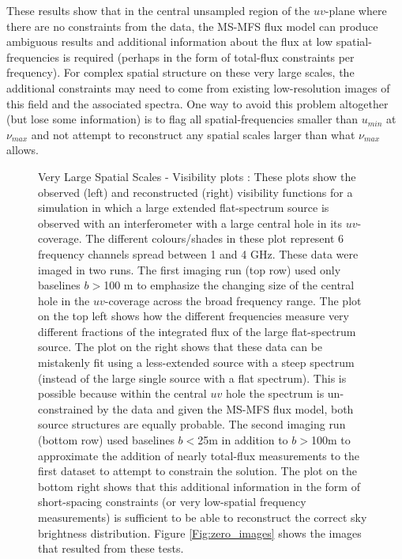 \documentclass[structabstract]{stylefiles/aa}
\begin{document}
\noindent These results show that in the central unsampled region
of the $uv$-plane where there are no constraints from the data,
the MS-MFS flux model can produce ambiguous results and additional
information about the flux at low spatial-frequencies is required
(perhaps in the form of total-flux constraints per frequency).
For complex spatial structure on these very large scales, the additional 
constraints may need to
come from existing low-resolution images of this field and the
associated spectra.
One way to avoid this problem altogether (but lose some information)
is to flag all spatial-frequencies smaller than $u_{min}$ at $\nu_{max}$
and not attempt to reconstruct any spatial scales larger than what
$\nu_{max}$ allows. 

\begin{figure}[h!]
\begin{center}
\end{center}
\caption[Very Large Spatial Scales : Visibility plots]%
{\small Very Large Spatial Scales - Visibility plots : 
These plots show the observed (left) and 
 reconstructed (right) visibility functions for a
simulation in which a large extended flat-spectrum source is observed
with an interferometer with a large central hole in its $uv$-coverage.
%
The different colours/shades in these plot represent
6 frequency channels spread between 1 and 4 GHz.
These data were imaged in two runs. 
%
The first imaging run (top row) used only
baselines $b>$100 m to emphasize the changing size of the central
hole in the $uv$-coverage across the broad frequency range. 
The plot on the top left shows 
how the different frequencies measure 
very different fractions of the integrated flux of the large flat-spectrum source.
The plot on the right shows
that these data can be mistakenly fit using a less-extended source with a steep
spectrum (instead of the large single source with a flat spectrum).
This is possible because within the central $uv$ hole
the spectrum is un-constrained by the data and given the MS-MFS flux model,
both source structures are equally probable.
%
The second imaging run (bottom row) used baselines $b<$25m in addition to $b>$100m to
approximate the addition of nearly total-flux measurements to the first
dataset to attempt to constrain the solution.
The plot on the bottom right shows that this additional information in the
form of short-spacing
constraints (or very low-spatial frequency measurements) is sufficient to
be able to reconstruct the correct sky brightness distribution.
Figure \ref{Fig:zero_images} shows the images that resulted from these tests.
}
\label{Fig:zero_visplot}
\end{figure}
\end{document}
